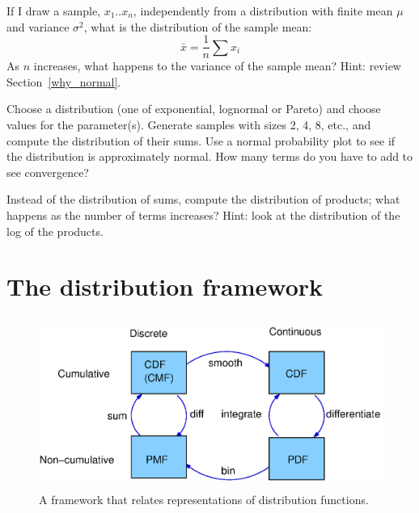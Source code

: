 \documentclass[12pt]{book}
\begin{document}

\newcommand{\xbar}{\bar{x}}

\begin{exercise}
If I draw a sample, $x_1 .. x_n$, independently from a
distribution with finite mean $\mu$ and variance $\sigma^2$, what is
the distribution of the sample mean:
%
\[ \xbar = \frac{1}{n} \sum x_i \]
%
As $n$ increases, what happens to the variance of the sample mean?
Hint: review Section~\ref{why_normal}.

\end{exercise}

\begin{exercise}
Choose a distribution (one of exponential, lognormal or Pareto) and
choose values for the parameter(s).  Generate samples with sizes
2, 4, 8, etc., and compute the distribution of their sums.  Use
a normal probability plot to see if the distribution is approximately
normal.  How many terms do you have to add to see convergence?



\end{exercise}


\begin{exercise}
Instead of the distribution of sums, compute the distribution of
products; what happens as the number of terms increases?
Hint: look at the distribution of the log of the products.


\end{exercise}

\section{The distribution framework}

\begin{figure}
\centerline{\includegraphics[height=2.2in]{figs/distribution_functions.eps}}
\caption{A framework that relates representations of distribution
functions.}
\label{dist_framework}
\end{figure}
\end{document}
